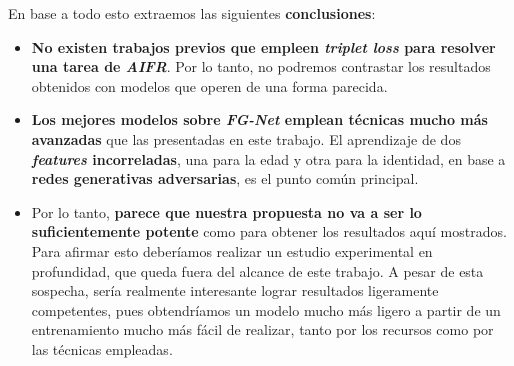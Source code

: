 En base a todo esto extraemos las siguientes \textbf{conclusiones}:

\begin{itemize}
	\item \textbf{No existen trabajos previos que empleen \textit{triplet loss} para resolver una tarea de \textit{AIFR}}. Por lo tanto, no podremos contrastar los resultados obtenidos con modelos que operen de una forma parecida.
	\item \textbf{Los mejores modelos sobre \textit{FG-Net} emplean técnicas mucho más avanzadas} que las presentadas en este trabajo. El aprendizaje de dos \textbf{\textit{features} incorreladas}, una para la edad y otra para la identidad, en base a \textbf{redes generativas adversarias}, es el punto común principal.
	\item Por lo tanto, \textbf{parece que nuestra propuesta no va a ser lo suficientemente potente} como para obtener los resultados aquí mostrados. Para afirmar esto deberíamos realizar un estudio experimental en profundidad, que queda fuera del alcance de este trabajo. A pesar de esta sospecha, sería realmente interesante lograr resultados ligeramente competentes, pues obtendríamos un modelo mucho más ligero a partir de un entrenamiento mucho más fácil de realizar, tanto por los recursos como por las técnicas empleadas.
\end{itemize}
